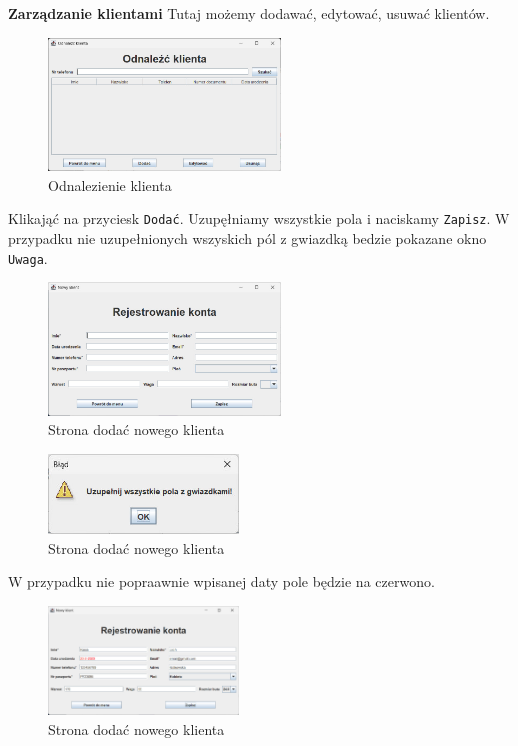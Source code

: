     \newpage
    \textbf{Zarządzanie klientami}
    \newline
    Tutaj możemy dodawać, edytować, usuwać klientów.
    \begin{figure}[h]
        \centering
        \includegraphics[width=0.55\textwidth]{figures/odn.jpg}
        \caption{Odnalezienie klienta}
    \end{figure}
    Klikająć na przyciesk \texttt{Dodać}.
    \newline
    Uzupęłniamy wszystkie pola i naciskamy \texttt{Zapisz}. W przypadku nie uzupełnionych wszyskich pól z gwiazdką bedzie pokazane okno \texttt{Uwaga}.
    \begin{figure}[h]
        \centering
        \includegraphics[width=0.55\textwidth]{figures/newKlient1.jpg}
        \caption{Strona dodać nowego klienta}
    \end{figure}
    \begin{figure}[h]
        \centering
        \includegraphics[width=0.45\textwidth]{figures/uwaga.jpg}
        \caption{Strona dodać nowego klienta}
    \end{figure}
    \newline
    W przypadku nie popraawnie wpisanej daty pole będzie na czerwono.
    \begin{figure}[h]
        \centering
        \includegraphics[width=0.45\textwidth]{figures/newKlient3.jpg}
        \caption{Strona dodać nowego klienta}
    \end{figure}
